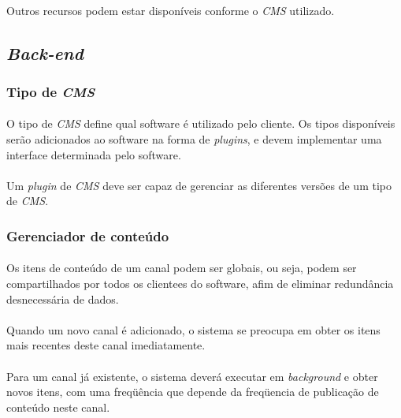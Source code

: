 \documentclass[a4paper,12pt]{article}
\def\cms{\emph{CMS}}
\begin{document}
\paragraph{}
Outros recursos podem estar disponíveis conforme o \cms{} utilizado.

\subsection{\emph{Back-end}}

\subsubsection{Tipo de \cms{}}

\paragraph{}
O tipo de \cms{} define qual software é utilizado pelo cliente. Os tipos
disponíveis serão adicionados ao software na forma de \emph{plugins}, e devem
implementar uma interface determinada pelo software.


\paragraph{}
Um \emph{plugin} de \cms{} deve ser capaz de gerenciar as diferentes versões de
um tipo de \cms{}.

\subsubsection{Gerenciador de conteúdo}

\paragraph{}
Os itens de conteúdo de um canal podem ser globais, ou seja, podem ser
compartilhados por todos os clientees do software, afim de eliminar redundância
desnecessária de dados.

\paragraph{}
Quando um novo canal é adicionado, o sistema se preocupa em obter os itens mais
recentes deste canal imediatamente.

\paragraph{}
Para um canal já existente, o sistema deverá executar em \emph{background} e
obter novos itens, com uma freqüência que depende da freqüencia de publicação
de conteúdo neste canal.
\end{document}

